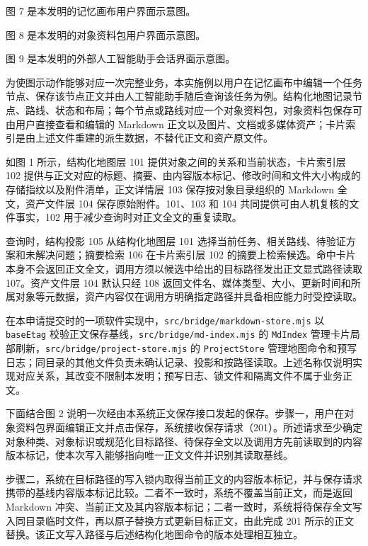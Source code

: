  图 7 是本发明的记忆画布用户界面示意图。

 图 8 是本发明的对象资料包用户界面示意图。

 图 9 是本发明的外部人工智能助手会话界面示意图。

 为使图示动作能够对应一次完整业务，本实施例以用户在记忆画布中编辑一个任务节点、保存该节点正文并由人工智能助手随后查询该任务为例。结构化地图记录节点、路线、状态和布局；每个节点或路线对应一个对象资料包，对象资料包保存可由用户直接查看和编辑的 Markdown 正文以及图片、文档或多媒体资产；卡片索引是由上述文件重建的派生数据，不替代正文和资产原文件。

 如图 1 所示，结构化地图层 101 提供对象之间的关系和当前状态，卡片索引层 102 提供与正文对应的标题、摘要、由内容版本标记、修改时间和文件大小构成的存储指纹以及附件清单，正文详情层 103 保存按对象目录组织的 Markdown 全文，资产文件层 104 保存原始附件。101、103 和 104 共同提供可由人机复核的文件事实，102 用于减少查询时对正文全文的重复读取。

 查询时，结构投影 105 从结构化地图层 101 选择当前任务、相关路线、待验证方案和未解决问题；摘要检索 106 在卡片索引层 102 的摘要上检索候选。命中卡片本身不会返回正文全文，调用方须以候选中给出的目标路径发出正文显式路径读取 107。资产文件层 104 默认只经 108 返回文件名、媒体类型、大小、更新时间和所属对象等元数据，资产内容仅在调用方明确指定路径并具备相应能力时受控读取。

 在本申请提交时的一项软件实现中，\nolinkurl{src/bridge/markdown-store.mjs} 以 \texttt{baseEtag} 校验正文保存基线，\nolinkurl{src/bridge/md-index.mjs} 的 \texttt{MdIndex} 管理卡片局部刷新，\nolinkurl{src/bridge/project-store.mjs} 的 \texttt{ProjectStore} 管理地图命令和预写日志；同目录的其他文件负责未确认记录、投影和按路径读取。上述名称仅说明实现对应关系，其改变不限制本发明；预写日志、锁文件和隔离文件不属于业务正文。

 下面结合图 2 说明一次经由本系统正文保存接口发起的保存。步骤一，用户在对象资料包界面编辑正文并点击保存，系统接收保存请求（201）。所述请求至少确定对象种类、对象标识或规范化目标路径、待保存全文以及调用方先前读取到的内容版本标记，使本次写入能够指向唯一正文文件并识别其读取基线。

 步骤二，系统在目标路径的写入锁内取得当前正文的内容版本标记，并与保存请求携带的基线内容版本标记比较。二者不一致时，系统不覆盖当前正文，而是返回 Markdown 冲突、当前正文及其内容版本标记；二者一致时，系统将待保存全文写入同目录临时文件，再以原子替换方式更新目标正文，由此完成 201 所示的正文替换。该正文写入路径与后述结构化地图命令的版本处理相互独立。

